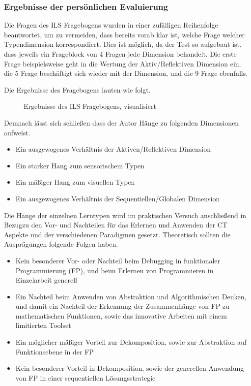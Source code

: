 \subsubsection{Ergebnisse der persönlichen Evaluierung}
Die Fragen des ILS Fragebogens wurden in einer zufälligen Reihenfolge beantwortet, um zu vermeiden, dass bereits vorab klar ist, welche Frage welcher Typendimension korrespondiert. Dies ist möglich, da der Test so aufgebaut ist, dass jeweils ein Frageblock von 4 Fragen jede Dimension behandelt. Die erste Frage beispielsweise geht in die Wertung der Aktiv/Reflektiven Dimension ein, die 5 Frage beschäftigt sich wieder mit der Dimension, und die 9 Frage ebenfalls.

Die Ergebnisse des Fragebogens lauten wie folgt.

\begin{figure}[H]
    \centering
    
    \caption{Ergebnisse des ILS Fragebogens, visualisiert}
\end{figure}

Demnach lässt sich schließen dass der Autor Hänge zu folgenden Dimensionen aufweist.

\begin{itemize}
    \item Ein ausgewogenes Verhältnis der Aktiven/Reflektiven Dimension
    \item Ein starker Hang zum sensorischem Typen 
    \item Ein mäßiger Hang zum visuellen Typen
    \item Ein ausgewogenes Verhältnis der Sequentiellen/Globalen Dimension
\end{itemize}

Die Hänge der einzelnen Lerntypen wird im praktischen Versuch anschließend in Bezugzu den Vor- und Nachteilen für das Erlernen und Anwenden der CT Aspekte und der verschiedenen Paradigmen gesetzt.
Theoretisch sollten die Ausprägungen folgende Folgen haben.

\begin{itemize}
    \item Kein besonderer Vor- oder Nachteil beim Debugging in funktionaler Programmierung (FP), und beim Erlernen von Programmieren in Einzelarbeit generell
    \item Ein Nachteil beim Anwenden von Abstraktion und Algorithmischen Denken, und damit ein Nachteil der Erkennung der Zusammenhänge von FP zu mathematischen Funktionen, sowie das innovative Arbeiten mit einem limitierten Toolset
    \item Ein möglicher mäßiger Vorteil zur Dekomposition, sowie zur Abstraktion auf Funktionsebene in der FP
    \item Kein besonderer Vorteil in Dekomposition, sowie der generellen Anwendung von FP in einer sequentiellen Lösungsstrategie
\end{itemize}

